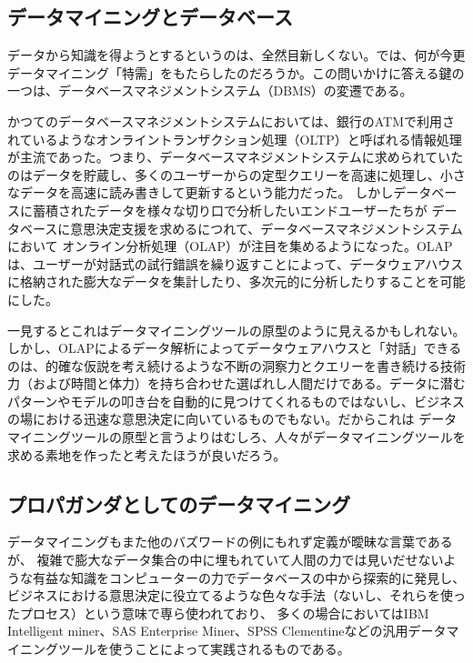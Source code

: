 \subsection{データマイニングとデータベース}
データから知識を得ようとするというのは、全然目新しくない。では、何が今更データマイニング「特需」をもたらしたのだろうか。この問いかけに答える鍵の一つは、データベースマネジメントシステム（DBMS）の変遷である。

かつてのデータベースマネジメントシステムにおいては、銀行のATMで利用されているようなオンライントランザクション処理（OLTP）と呼ばれる情報処理が主流であった。つまり、データベースマネジメントシステムに求められていたのはデータを貯蔵し、多くのユーザーからの定型クエリーを高速に処理し、小さなデータを高速に読み書きして更新するという能力だった。
しかしデータベースに蓄積されたデータを様々な切り口で分析したいエンドユーザーたちが
データベースに意思決定支援を求めるにつれて、データベースマネジメントシステムにおいて
オンライン分析処理（OLAP）が注目を集めるようになった。OLAPは、ユーザーが対話式の試行錯誤を繰り返すことによって、データウェアハウスに格納された膨大なデータを集計したり、多次元的に分析したりすることを可能にした。

一見するとこれはデータマイニングツールの原型のように見えるかもしれない。しかし、OLAPによるデータ解析によってデータウェアハウスと「対話」できるのは、的確な仮説を考え続けるような不断の洞察力とクエリーを書き続ける技術力（および時間と体力）を持ち合わせた選ばれし人間だけである。データに潜むパターンやモデルの叩き台を自動的に見つけてくれるものではないし、ビジネスの場における迅速な意思決定に向いているものでもない。だからこれは
データマイニングツールの原型と言うよりはむしろ、人々がデータマイニングツールを求める素地を作ったと考えたほうが良いだろう。

\subsection{プロパガンダとしてのデータマイニング}
データマイニングもまた他のバズワードの例にもれず定義が曖昧な言葉であるが、
複雑で膨大なデータ集合の中に埋もれていて人間の力では見いだせないような有益な知識をコンピューターの力でデータベースの中から探索的に発見し、ビジネスにおける意思決定に役立てるような色々な手法（ないし、それらを使ったプロセス）という意味で専ら使われており、
多くの場合においてはIBM Intelligent miner、SAS Enterprise Miner、SPSS Clementineなどの汎用データマイニングツールを使うことによって実践されるものである。

